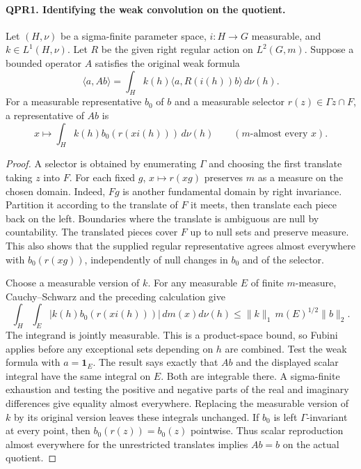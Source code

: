 \paragraph{QPR1. Identifying the weak convolution on the quotient.}
Let \((H,\nu)\) be a sigma-finite parameter space, \(i:H\to G\)
measurable, and \(k\in L^1(H,\nu)\). Let \(R\) be the given right
regular action on \(L^2(G,m)\). Suppose a bounded operator \(A\)
satisfies the original weak formula
\[
 \langle a,Ab\rangle=\int_H k(h)\langle a,R(i(h))b\rangle\,d\nu(h).
\]
For a measurable representative \(b_0\) of \(b\) and a measurable
selector \(r(z)\in\Gamma z\cap F\), a representative of \(Ab\) is
\[
 x\longmapsto \int_H k(h)b_0(r(xi(h)))\,d\nu(h)
 \qquad(m\text{-almost every }x).
\]
\begin{proof}
A selector is obtained by enumerating \(\Gamma\) and choosing the
first translate taking \(z\) into \(F\). For each fixed \(g\),
\(x\mapsto r(xg)\) preserves \(m\) as a measure on the chosen
domain. Indeed, \(Fg\) is another fundamental domain by right
invariance. Partition it according to the translate of \(F\) it
meets, then translate each piece back on the left. Boundaries where
the translate is ambiguous are null by countability. The translated
pieces cover \(F\) up to null sets and preserve measure. This also
shows that the supplied regular representative agrees almost
everywhere with \(b_0(r(xg))\), independently of null changes in
\(b_0\) and of the selector.

Choose a measurable version of \(k\). For any measurable \(E\)
of finite \(m\)-measure, Cauchy--Schwarz and the preceding calculation
give
\[
 \int_H\!\int_E |k(h)b_0(r(xi(h)))|\,dm(x)d\nu(h)
 \le \|k\|_1\,m(E)^{1/2}\|b\|_2.
\]
The integrand is jointly measurable. This is a product-space bound,
so Fubini applies before any exceptional sets depending on \(h\)
are combined. Test the weak formula with \(a=\mathbf1_E\). The
result says exactly that \(Ab\) and the displayed scalar integral
have the same integral on \(E\). Both are integrable there. A
sigma-finite exhaustion and testing the positive and negative parts
of the real and imaginary differences give equality almost everywhere.
Replacing the measurable version of \(k\) by its original version
leaves these integrals unchanged. If \(b_0\) is left
\(\Gamma\)-invariant at every point, then \(b_0(r(z))=b_0(z)\)
pointwise. Thus scalar reproduction almost everywhere for the
unrestricted translates implies \(Ab=b\) on the actual quotient.
\end{proof}

